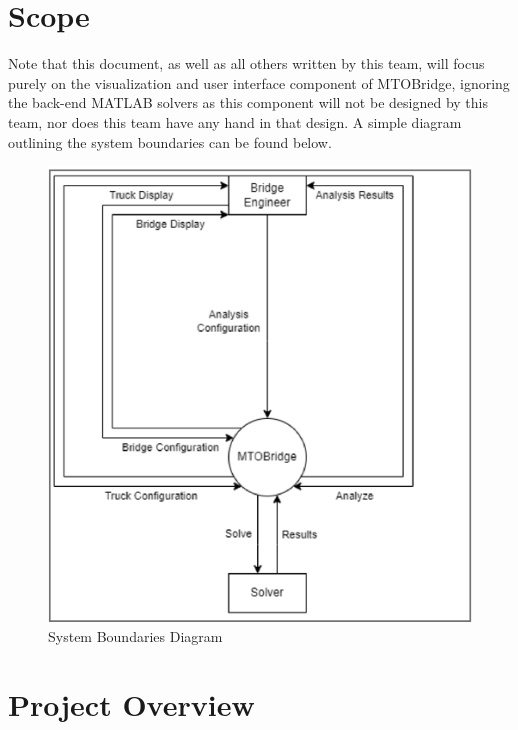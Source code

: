 \documentclass[12pt, titlepage]{article}
\begin{document}
\section{Scope}
Note that this document, as well as all others written by this team, will focus purely on the visualization and user interface component of MTOBridge, ignoring the back-end MATLAB solvers as this component will not be designed by this team, nor does this team have any hand in that design. A simple diagram outlining the system boundaries can be found below.
\begin{figure}[H]
  \centering
  \includegraphics[]{../images/system-boundaries.PNG}
  \caption{System Boundaries Diagram}
  \label{fig:system-boundaries-diagram}
\end{figure}

\section{Project Overview}
\end{document}
